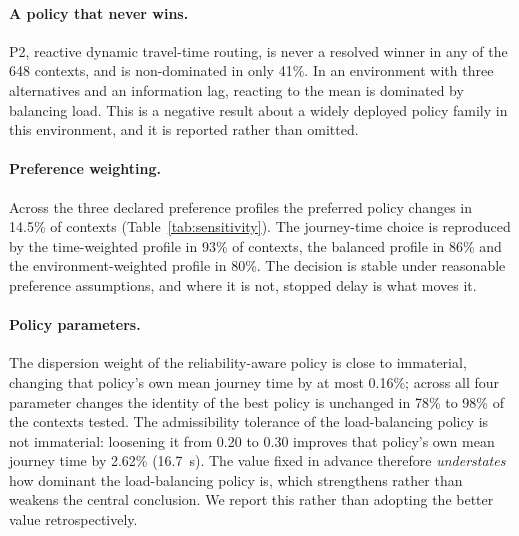 \documentclass[runningheads]{llncs}
\begin{document}
\paragraph{A policy that never wins.} P2, reactive dynamic travel-time routing,
is never a resolved winner in any of the 648 contexts, and is
non-dominated in only 41\%. In an environment with three
alternatives and an information lag, reacting to the mean is dominated by
balancing load. This is a negative result about a widely deployed policy family
in this environment, and it is reported rather than omitted.

\paragraph{Preference weighting.} Across the three declared preference profiles
the preferred policy changes in 14.5\% of contexts
(Table~\ref{tab:sensitivity}). The journey-time choice is reproduced by the
time-weighted profile in 93\% of contexts, the balanced profile
in 86\% and the environment-weighted profile in
80\%. The decision is stable under reasonable preference
assumptions, and where it is not, stopped delay is what moves it.

\paragraph{Policy parameters.} The dispersion weight of the reliability-aware
policy is close to immaterial, changing that policy's own mean journey time by
at most 0.16\%; across all four parameter changes the identity
of the best policy is unchanged in 78\% to
98\% of the contexts tested. The admissibility tolerance of the
load-balancing policy is not immaterial: loosening it from 0.20 to
0.30 improves that policy's own mean journey time by 2.62\%
(16.7~s). The value fixed in advance therefore \emph{understates} how
dominant the load-balancing policy is, which strengthens rather than weakens the
central conclusion. We report this rather than adopting the better value
retrospectively.
\end{document}
